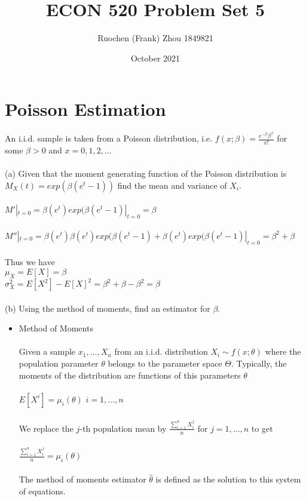 \documentclass{article}
\title{ECON 520 Problem Set 5}
\author{Ruochen (Frank) Zhou 1849821}
\date{October 2021}
\begin{document}
\maketitle

\section{Poisson Estimation}
An i.i.d. sample is taken from a Poisson distribution, i.e. $f(x;\beta)=\frac{e^{-\beta}\beta^x}{x!}$ for some $\beta>0$ and $x=0,1,2,...$\\\\
(a)  Given that the moment generating function of the Poisson distribution is $M_X(t)=exp(\beta(e^t-1))$ find the mean and variance of $X_i$.\\\\
$M'|_{t=0}=\beta(e^t)exp(\beta(e^t-1)|_{t=0}=\beta$\\\\
$M''|_{t=0}=\beta(e^t)\beta(e^t)exp(\beta(e^t-1)+\beta(e^t)exp(\beta(e^t-1)|_{t=0}=\beta^2+\beta$\\\\
Thus we have\\
$\mu_X=E[X]=\beta$\\
$\sigma^2_X=E[X^2]-E[X]^2=\beta^2+\beta-\beta^2=\beta$\\\\
(b)  Using the method of moments, find an estimator for $\beta$.
\begin{itemize}
    \item Method of Moments\\\\
    Given a sample $x_1,...,X_n$ from an i.i.d. distribution $X_i\sim f(x;\theta)$ where the population parameter $\theta$ belongs to the parameter space $\Theta$.  Typically, the moments of the distribution are functions of this parameters $\theta$\\\\
    $E[X^i]=\mu_i(\theta)$ $i=1,...,n$\\\\
    We replace the $j$-th population mean by $\frac{\sum_{i=1}^nX_i^j}{n}$ for $j=1,...,n$ to get \\\\
    $\frac{\sum_{i=1}^nX_i^j}{n}=\mu_i(\theta)$\\\\
    The method of moments estimator $\hat{\theta}$ is defined as the solution to this system of equations.
\end{itemize}
\end{document}
